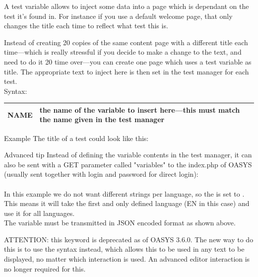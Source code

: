 \documentclass[12pt]{article} %
\newenvironment{keyword}{\leavevmode\color{magenta}}{}
\newenvironment{properties}
	{
    	\footnotesize\renewcommand{\arraystretch}{1.30}
  		\renewcommand{\tabcolsep}{0pt}
   		\begin{longtable}{>{\begin{keyword}}p{3.1cm}<{\end{keyword}}p{13.9cm}}
    	\hline
	}
	{
		\hline\end{longtable}\vspace{5mm}
	}
\begin{document}
A test variable allows to inject some data into a page which is dependant on the test it's found in.
For instance if you use a default welcome page, that only changes the title each time to reflect what test this is.

Instead of creating 20 copies of the same content page with a different title each time—which is really stressful if you decide to make a change to the text, and need to do it 20 time over—you can create one page which uses a test variable as title.
The appropriate text to inject here is then set in the test manager for each test. \\

Syntax:\hspace{0.5cm}\kw{[@VAR ... @]}

\begin{properties}
\hline
NAME & the name of the variable to insert here—this must match the name given in the test manager\\
\hline
\end{properties}
\vspace{0.1cm}

\begin{exampleBox}{Example}
	The title of a test could look like this:\\
	\kw{[@VAR NAME="testtitle"@]}
\end{exampleBox}

\begin{advancedBox}{Advanced tip}
	Instead of defining the variable contents in the test manager, it can also be sent with a GET parameter called "variables" to the index.php of OASYS (usually sent together with login and password for direct login):\\ 
	
	 \\
	
		In this example we do not want different strings per language, so the  is set to .
		This means it will take the first and only defined language (EN in this case) and use it for all languages. \\
	
	The variable must be transmitted in JSON encoded format as shown above.
	
\end{advancedBox}

ATTENTION: this keyword is deprecated as of OASYS 3.6.0. The new way to do this is to use the syntax  instead, which allows this to be used in any text to be displayed, no matter which interaction is used. An advanced editor interaction is no longer required for this. \\
\end{document}
